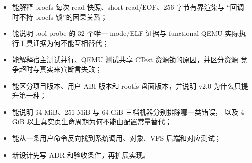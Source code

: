 \begin{itemize}
  \item 能解释 procfs 每次 read 快照、short read/EOF、256 字节有界渲染与
        “回调时不持 procfs 锁”的因果关系；
  \item 能说明 tool probe 的 32 个唯一 inode/ELF 证据与 functional QEMU
        实际执行工具证据为何不能互相替代；
  \item 能解释宿主测试并行、QEMU 测试共享 CTest 资源锁的原因，并区分资源
        竞争超时与真实来宾断言失败；
  \item 能区分项目版本、用户 ABI 版本和 rootfs 盘面版本，并说明 v2.0
        为什么只提升第一种；
  \item 能说明 64 MiB、256 MiB 与 64 GiB 三档机器分别排除哪一类错误，
        以及 4 GiB 以上真实页生命周期为何不能由配置常量替代；
  \item 能从一条用户命令反向找到系统调用、对象、VFS 后端和对应测试；
  \item 新设计先写 ADR 和验收条件，再扩展实现。
\end{itemize}

